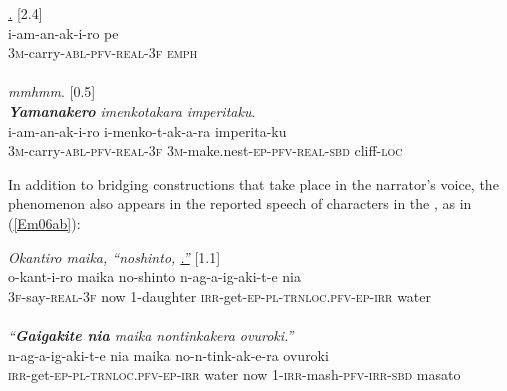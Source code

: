 \documentclass[output=paper]{LSP/langsci}
\begin{document}
\begin{exe}
\ex \label{Em05ab}
\begin{xlist}
\ex \label{Emex:05a}
\glt \textit{\underline{.} } [2.4]\\
\gll i-am-an-ak-i-ro pe\\
 \textsc{3m-}carry\textsc{-abl-pfv-real-3f} \textsc{emph}\\
\glt {}\\
\ex \label{Emex:05b}
\glt \textit{mmhmm}. [0.5]\\
\ex \label{Emex:05c}
\glt \textit{\textbf{Yamanakero} imenkotakara imperitaku}.\\
\gll i-am-an-ak-i-ro i-menko-t-ak-a-ra imperita-ku \\     	      
   \textsc{3m-}carry\textsc{-abl-pfv-real-3f} \textsc{3m-}make.nest\textsc{-ep-pfv-real-sbd} cliff\textsc{-loc}\\
\glt {}
\end{xlist}
\end{exe}



In addition to bridging constructions that take place in the narrator’s voice, the phenomenon also appears in the reported speech of characters in the , as in (\ref{Em06ab}): 

\begin{exe}
\ex \label{Em06ab}
\begin{xlist}
\ex \label{Emex:06a}
\glt \textit{Okantiro maika, ``noshinto, \underline{.''}} [1.1]\\
\gll o-kant-i-ro maika no-shinto n-ag-a-ig-aki-t-e nia \\
 \textsc{3f-}say\textsc{-real-3f} now \textsc{1-}daughter \textsc{irr-}get\textsc{-ep-pl-trnloc.pfv-ep-irr} water\\
\glt {}\\
\ex \label{Emex:06b}
\glt \textit{``\textbf{Gaigakite nia} maika nontinkakera ovuroki.''}\\
\gll n-ag-a-ig-aki-t-e nia maika no-n-tink-ak-e-ra ovuroki\\     	      
   \textsc{irr-}get\textsc{-ep-pl-trnloc.pfv-ep-irr} water now \textsc{1-irr-}mash\textsc{-pfv-irr-sbd} masato\\
\glt {}
\end{xlist}
\end{exe}
\end{document}
